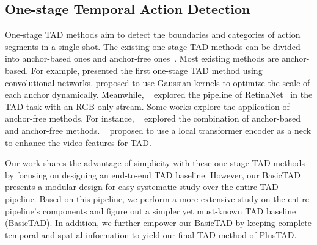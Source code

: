\documentclass[a4paper,fleqn]{cas-dc}
\begin{document}
\subsection{One-stage Temporal Action Detection}  
One-stage TAD methods aim to detect the boundaries and categories of action segments in a single shot. The existing one-stage TAD methods can be divided into anchor-based ones \citep{rgb_enough,ssad,end2end,gtan,a2net} and anchor-free ones~\citep{a2net,actionformer}. Most existing methods are anchor-based. For example, \cite{ssad} presented the first one-stage TAD method using convolutional networks. \citep{gtan} proposed to use Gaussian kernels to optimize the scale of each anchor dynamically. Meanwhile, ~\cite{rgb_enough} explored the pipeline of RetinaNet~\citep{retina} in the TAD task with an RGB-only stream. Some works explore the application of anchor-free methods. For instance, ~\cite{a2net} explored the combination of anchor-based and anchor-free methods. ~\cite{actionformer} proposed to use a local transformer encoder as a neck to enhance the video features for TAD.

Our work shares the advantage of simplicity with these one-stage TAD methods by focusing on designing an end-to-end TAD baseline. However, our BasicTAD presents a modular design for easy systematic study over the entire TAD pipeline. Based on this pipeline, we perform a more extensive study on the entire pipeline's components and figure out a simpler yet must-known TAD baseline (BasicTAD). In addition, we further empower our BasicTAD by keeping complete temporal and spatial information to yield our final TAD method of PlusTAD.
\end{document}
